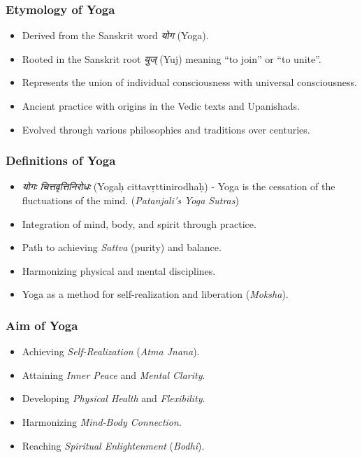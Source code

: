 \begin{frame}[fragile]\frametitle{Etymology of Yoga}

      \begin{itemize}
		\item Derived from the Sanskrit word \textit{योग} (Yoga).
		\item Rooted in the Sanskrit root \textit{युज्} (Yuj) meaning “to join” or “to unite”.
		\item Represents the union of individual consciousness with universal consciousness.
		\item Ancient practice with origins in the Vedic texts and Upanishads.
		\item Evolved through various philosophies and traditions over centuries.
	  \end{itemize}

\end{frame}

\begin{frame}[fragile]\frametitle{Definitions of Yoga}

      \begin{itemize}
		\item \textit{योगः चित्तवृत्तिनिरोधः} (Yogaḥ cittavṛttinirodhaḥ) - Yoga is the cessation of the fluctuations of the mind. (\textit{Patanjali's Yoga Sutras})
		\item Integration of mind, body, and spirit through practice.
		\item Path to achieving \textit{Sattva} (purity) and balance.
		\item Harmonizing physical and mental disciplines.
		\item Yoga as a method for self-realization and liberation (\textit{Moksha}).
	  \end{itemize}

\end{frame}

\begin{frame}[fragile]\frametitle{Aim of Yoga}

      \begin{itemize}
		\item Achieving \textit{Self-Realization} (\textit{Atma Jnana}).
		\item Attaining \textit{Inner Peace} and \textit{Mental Clarity}.
		\item Developing \textit{Physical Health} and \textit{Flexibility}.
		\item Harmonizing \textit{Mind-Body Connection}.
		\item Reaching \textit{Spiritual Enlightenment} (\textit{Bodhi}).
	  \end{itemize}

\end{frame}

